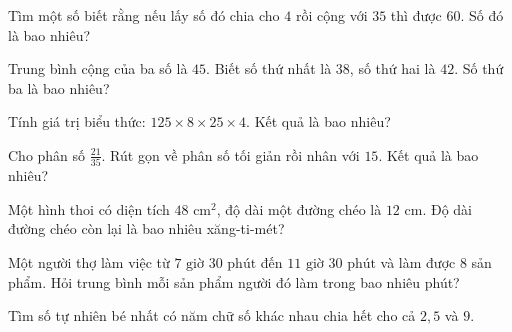 \begin{ex}
  Tìm một số biết rằng nếu lấy số đó chia cho $4$ rồi cộng với $35$ thì được $60$. Số đó là bao nhiêu?
\end{ex}

\begin{ex}
  Trung bình cộng của ba số là $45$. Biết số thứ nhất là $38$, số thứ hai là $42$. Số thứ ba là bao nhiêu?
\end{ex}

\begin{ex}
  Tính giá trị biểu thức: $125 \times 8 \times 25 \times 4$. Kết quả là bao nhiêu?
\end{ex}

\begin{ex}
  Cho phân số $\frac{21}{35}$. Rút gọn về phân số tối giản rồi nhân với $15$. Kết quả là bao nhiêu?
\end{ex}

\begin{ex}
  Một hình thoi có diện tích $48\text{ cm}^2$, độ dài một đường chéo là $12\text{ cm}$. Độ dài đường chéo còn lại là bao nhiêu xăng-ti-mét?
\end{ex}

\begin{ex}
  Một người thợ làm việc từ $7\text{ giờ } 30\text{ phút}$ đến $11\text{ giờ } 30\text{ phút}$ và làm được $8$ sản phẩm. Hỏi trung bình mỗi sản phẩm người đó làm trong bao nhiêu phút?
\end{ex}

\begin{ex}
  Tìm số tự nhiên bé nhất có năm chữ số khác nhau chia hết cho cả $2, 5$ và $9$.
\end{ex}

